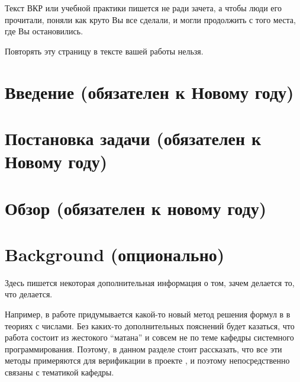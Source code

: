 




\usepackage{totcount}




\maketitle
\setcounter{tocdepth}{2}
\tableofcontents

\pagebreak
\begin{center}
  {\Huge
  Текст ВКР или учебной практики пишется не ради зачета, а чтобы люди его прочитали, поняли как круто Вы все сделали, и могли продолжить с того места, где Вы остановились.}

\vspace{2em}
Повторять эту страницу в тексте вашей работы нельзя.
\end{center}
\pagebreak

\section*{Введение (обязателен к Новому году)}


\section{Постановка задачи (обязателен к Новому году)}


\section{Обзор (обязателен к новому году)}


\section{Background (опционально)}
Здесь пишется некоторая дополнительная информация о том, зачем делается то, что делается.

Например, в работе придумывается какой-то новый метод решения формул в \SMT{} в теориях с числами. Без каких-то дополнительных пояснений будет казаться, что работа состоит из жестокого ``матана'' и совсем не по теме кафедры системного программирования.
Поэтому, в данном разделе стоит рассказать, что все эти методы примеряются для верификации в проекте \vsharp{}, и поэтому непосредственно связаны с тематикой кафедры.


